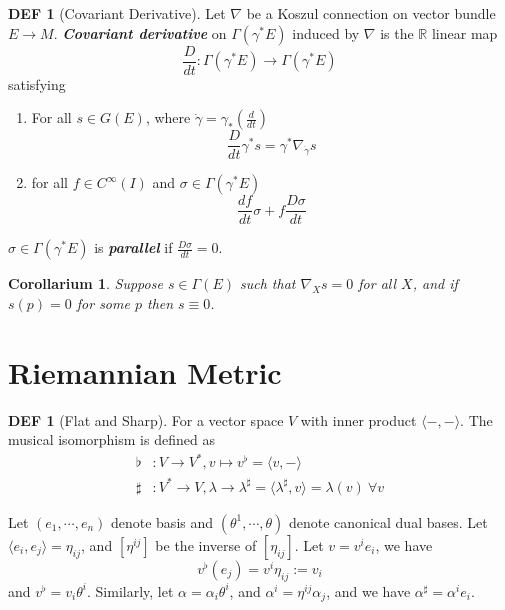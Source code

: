 \documentclass[twocolumn]{article}
\renewcommand{\emph}[1]{\textbf{\textit{#1}}}
\newcommand{\n}{\nabla}
\newcommand{\R}{\mathbb{R}}
\newcommand{\C}{C^{\infty}}
\newcommand{\G}{\Gamma}
\newcommand{\g}{\gamma}
\newtheorem{corollary}[thm]{Corollarium}
\theoremstyle{definition}
\newtheorem{defi}[thm]{DEF}
\begin{document}
\begin{defi}[Covariant Derivative]
	Let $\n$ be a Koszul connection on vector bundle $E \rightarrow M$. 
	\emph{Covariant derivative} on $\G(\g^{*} E)$ induced by $\n$ is the $\R$ linear map 
	$$
	\frac{D}{dt} : \G(\g^* E) \rightarrow \G(\g^* E)
	$$
	satisfying 
	\begin{enumerate}
		\item For all $s \in G(E)$, where $\dot{\g} = \gamma_* (\frac{d}{dt})$
			$$
			\frac{D}{dt} \g^*s = \g^* \n_{\dot{\g}} s
			$$
		\item for all $f \in \C(I)$ and $\sigma \in \G(\g^*E)$
			$$
			\frac{df}{dt} \sigma + f \frac{D \sigma}{dt}
			$$
	\end{enumerate}

	$\sigma \in \G(\g^*E)$ is \emph{parallel} if $\frac{D \sigma}{dt} = 0$.
\end{defi}

\begin{corollary}
	Suppose $s \in \G(E)$ such that $\n_X s = 0$ for all $X$, and if $s(p) = 0$ for some $p$ then $s \equiv 0$.
\end{corollary}

\section{Riemannian Metric}

\begin{defi}[Flat and Sharp]
	 For a vector space $V$ with inner product $\langle -, - \rangle$. 
	 The musical isomorphism is defined as
	 \begin{align*}
		 \flat &: V \rightarrow V^*, v \mapsto v^{\flat} = \langle v, - \rangle \\
		 \sharp &:  V^* \rightarrow V, \lambda \rightarrow  \lambda^{\sharp} = \langle \lambda^{\sharp}, v \rangle = \lambda(v) \ \forall v
	 \end{align*}
\end{defi}

\begin{eg}{}{}
	Let $(e_1, \cdots, e_n)$ denote basis and $(\theta^1, \cdots, \theta)$ denote canonical dual bases. 
	Let $\langle e_i, e_j\rangle = \eta_{ij}$, and $[\eta^{ij}]$ be the inverse of $[\eta_{ij}]$.
	Let $v = v^ie_i$, we have 
	$$
	v^{\flat}(e_j) = v^i \eta_{ij} := v_i
	$$
	and $v^{\flat}= v_i \theta^{i}$.
	Similarly, let $\alpha = \alpha_i \theta^i$, and $\alpha^i = \eta^{ij}\alpha_j$, and we have $\alpha^{\sharp} = \alpha^i e_i$.
\end{eg}
\end{document}
